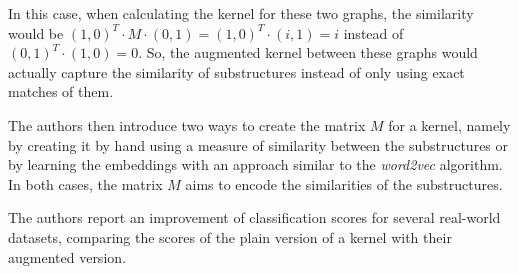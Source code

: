 In this case, when calculating the kernel for these two graphs, the similarity would be $(1, 0)^T \cdot M \cdot (0, 1) = (1, 0)^T \cdot (i, 1) = i$ instead of $(0, 1)^T \cdot (1, 0) = 0$.
So, the augmented kernel between these graphs would actually capture the similarity of substructures instead of only using exact matches of them.

The authors then introduce two ways to create the matrix $M$ for a kernel, namely by creating it by hand using a measure of similarity between the substructures or by learning the embeddings with an approach similar to the \textit{word2vec} algorithm.
In both cases, the matrix $M$ aims to encode the similarities of the substructures.

The authors report an improvement of classification scores for several real-world datasets, comparing the scores of the plain version of a kernel with their augmented version.



